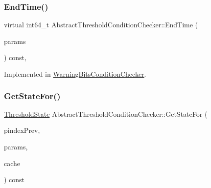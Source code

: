\subsubsection{\texorpdfstring{End\+Time()}{EndTime()}}
{\footnotesize\ttfamily virtual int64\+\_\+t Abstract\+Threshold\+Condition\+Checker\+::\+End\+Time (\begin{DoxyParamCaption}\item[{const \mbox{\hyperlink{chainparams_8h_a5e1ca1b35c3dd1a4e20f18445f28dd9c}{Consensus\+::\+Params}} \&}]{params }\end{DoxyParamCaption}) const\hspace{0.3cm}{\ttfamily [protected]}, {}}



Implemented in \mbox{\hyperlink{class_warning_bits_condition_checker_ace6c66438992ea0f798806f39eca83a7}{Warning\+Bits\+Condition\+Checker}}.

\mbox{\label{class_abstract_threshold_condition_checker_a7986d06396d52f6961d7c983dc68b8f3}} 
\subsubsection{\texorpdfstring{Get\+State\+For()}{GetStateFor()}}
{\footnotesize\ttfamily \mbox{\hyperlink{versionbits_8h_ae7f620361ae33b80687a42adb26fd7a4}{Threshold\+State}} Abstract\+Threshold\+Condition\+Checker\+::\+Get\+State\+For (\begin{DoxyParamCaption}\item[{const \mbox{\hyperlink{class_c_block_index}{C\+Block\+Index}} $\ast$}]{pindex\+Prev,  }\item[{const \mbox{\hyperlink{chainparams_8h_a5e1ca1b35c3dd1a4e20f18445f28dd9c}{Consensus\+::\+Params}} \&}]{params,  }\item[{\mbox{\hyperlink{versionbits_8h_a06fae3f599b3fadc0ea127cd55c111ab}{Threshold\+Condition\+Cache}} \&}]{cache }\end{DoxyParamCaption}) const}

\mbox{\label{class_abstract_threshold_condition_checker_a34b66faf36426413918aedda5213d110}} 

